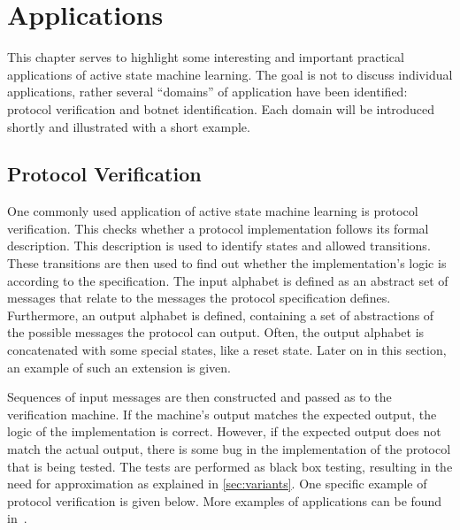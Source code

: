 \documentclass[multi,crop=false,class=article]{standalone}
\begin{document}
\section{Applications}
\label{sec:applications}

This chapter serves to highlight some interesting and important practical
applications of active state machine learning. The goal is not to discuss
individual applications, rather several ``domains'' of application have been
identified: protocol verification and  botnet identification.
Each domain will be introduced shortly and illustrated with a short example.

\subsection{Protocol Verification}
One commonly used application of active state machine learning is
protocol verification. This checks whether a protocol implementation follows
its formal description. This description is used to identify states and
allowed transitions. These transitions are then used to find out whether the
implementation's logic is according to the specification. The input alphabet
is defined as an abstract set of messages that relate to the messages the
protocol specification defines. Furthermore, an output alphabet is defined,
containing a set of abstractions of the possible messages the protocol can
output. Often, the output alphabet is concatenated with some special states,
like a reset state. Later on in this section, an example of such an extension
is given.

Sequences of input messages are then constructed and passed as to the
verification machine. If the machine's output matches the expected output, the
logic of the implementation is correct. However, if the expected output does
not match the actual output, there is some bug in the implementation of the
protocol that is being tested. The tests are performed as black box testing,
resulting in the need for approximation as explained in \cref{sec:variants}.
One specific example of protocol verification is given below. More examples of
applications can be found in~\cite{Aarts2013,Cho2010,Aarts2010}.
\end{document}
